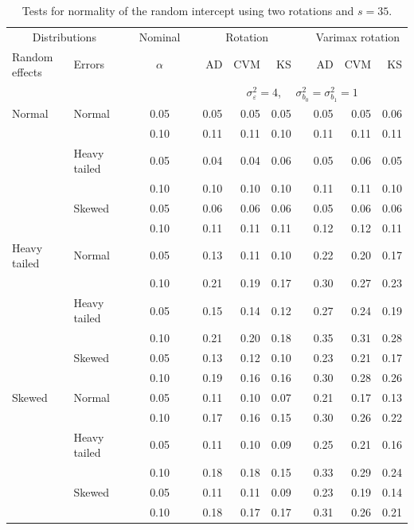 \documentclass[12pt]{article} %
\begin{document}
\begin{table}[ht]
\caption{Tests for normality of the random intercept using two rotations and $s = 35$.}
\begin{scriptsize}
\begin{center}
\begin{tabular}{ll p{.1cm} c p{.1cm} rrr p{.1cm} rrr}
  \hline
  \multicolumn{2}{c}{Distributions}& & Nominal & &  \multicolumn{3}{c}{Rotation} & & \multicolumn{3}{c}{Varimax rotation} \\ \cline{1-2} \cline{6-8} \cline{10-12}   
  Random effects & Errors & & $\alpha$ & & AD & CVM & KS & & AD & CVM & KS \\ 
   \hline
& && && \multicolumn{7}{c}{$\sigma_{\varepsilon}^2 = 4$, \ \ $\sigma_{b_0}^2 = \sigma_{b_1}^2 = 1$} \\ \cline{6-12}
Normal       & Normal       && 0.05 &&  0.05 & 0.05 & 0.05 && 0.05 & 0.05 & 0.06 \\ 
             &              && 0.10 &&  0.11 & 0.11 & 0.10 && 0.11 & 0.11 & 0.11 \\ 
             & Heavy tailed && 0.05 &&  0.04 & 0.04 & 0.06 && 0.05 & 0.06 & 0.05 \\ 
             &              && 0.10 &&  0.10 & 0.10 & 0.10 && 0.11 & 0.11 & 0.10 \\ 
             & Skewed       && 0.05 &&  0.06 & 0.06 & 0.06 && 0.05 & 0.06 & 0.06 \\ 
             &              && 0.10 &&  0.11 & 0.11 & 0.11 && 0.12 & 0.12 & 0.11 \\ 
Heavy tailed & Normal       && 0.05 &&  0.13 & 0.11 & 0.10 && 0.22 & 0.20 & 0.17 \\ 
             &              && 0.10 &&  0.21 & 0.19 & 0.17 && 0.30 & 0.27 & 0.23 \\ 
             & Heavy tailed && 0.05 &&  0.15 & 0.14 & 0.12 && 0.27 & 0.24 & 0.19 \\ 
             &              && 0.10 &&  0.21 & 0.20 & 0.18 && 0.35 & 0.31 & 0.28 \\ 
             & Skewed       && 0.05 &&  0.13 & 0.12 & 0.10 && 0.23 & 0.21 & 0.17 \\ 
             &              && 0.10 &&  0.19 & 0.16 & 0.16 && 0.30 & 0.28 & 0.26 \\ 
Skewed       & Normal       && 0.05 &&  0.11 & 0.10 & 0.07 && 0.21 & 0.17 & 0.13 \\ 
             &              && 0.10 &&  0.17 & 0.16 & 0.15 && 0.30 & 0.26 & 0.22 \\ 
             & Heavy tailed && 0.05 &&  0.11 & 0.10 & 0.09 && 0.25 & 0.21 & 0.16 \\ 
             &              && 0.10 &&  0.18 & 0.18 & 0.15 && 0.33 & 0.29 & 0.24 \\ 
             & Skewed       && 0.05 &&  0.11 & 0.11 & 0.09 && 0.23 & 0.19 & 0.14 \\ 
             &              && 0.10 &&  0.18 & 0.17 & 0.17 && 0.31 & 0.26 & 0.21 \\ 


\end{tabular}
\end{center}
\end{scriptsize}
\end{table}
\end{document}

